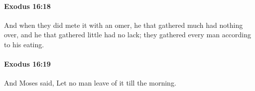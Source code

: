 		\paragraph{Exodus 16:18} %
			\label{EXODUS-16-18}

			And when they did mete it with an omer, he that gathered much had nothing over, and he that gathered little had no lack; they gathered every man according to his eating.


		\paragraph{Exodus 16:19} %
			\label{EXODUS-16-19}

			And Moses said, Let no man leave of it till the morning.


